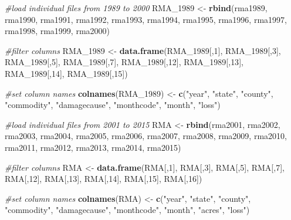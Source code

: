 \documentclass[]{article}
\newenvironment{Shaded}{\begin{snugshade}}{\end{snugshade}}
\newcommand{\CommentTok}[1]{\textcolor[rgb]{0.56,0.35,0.01}{\textit{#1}}}
\newcommand{\DecValTok}[1]{\textcolor[rgb]{0.00,0.00,0.81}{#1}}
\newcommand{\KeywordTok}[1]{\textcolor[rgb]{0.13,0.29,0.53}{\textbf{#1}}}
\newcommand{\NormalTok}[1]{#1}
\newcommand{\StringTok}[1]{\textcolor[rgb]{0.31,0.60,0.02}{#1}}
\begin{document}
\begin{Shaded}
\begin{Highlighting}[]
\CommentTok{#load individual files from 1989 to 2000}
\NormalTok{RMA_}\DecValTok{1989}\NormalTok{ <-}\StringTok{ }\KeywordTok{rbind}\NormalTok{(rma1989, rma1990, rma1991, rma1992, rma1993, rma1994, rma1995, rma1996, rma1997, rma1998, rma1999, rma2000)}

\CommentTok{#filter columns}
\NormalTok{RMA_}\DecValTok{1989}\NormalTok{ <-}\StringTok{ }\KeywordTok{data.frame}\NormalTok{(RMA_}\DecValTok{1989}\NormalTok{[,}\DecValTok{1}\NormalTok{], RMA_}\DecValTok{1989}\NormalTok{[,}\DecValTok{3}\NormalTok{], RMA_}\DecValTok{1989}\NormalTok{[,}\DecValTok{5}\NormalTok{], RMA_}\DecValTok{1989}\NormalTok{[,}\DecValTok{7}\NormalTok{], RMA_}\DecValTok{1989}\NormalTok{[,}\DecValTok{12}\NormalTok{], RMA_}\DecValTok{1989}\NormalTok{[,}\DecValTok{13}\NormalTok{], RMA_}\DecValTok{1989}\NormalTok{[,}\DecValTok{14}\NormalTok{], RMA_}\DecValTok{1989}\NormalTok{[,}\DecValTok{15}\NormalTok{])}

\CommentTok{#set column names}
\KeywordTok{colnames}\NormalTok{(RMA_}\DecValTok{1989}\NormalTok{) <-}\StringTok{ }\KeywordTok{c}\NormalTok{(}\StringTok{"year"}\NormalTok{, }\StringTok{"state"}\NormalTok{, }\StringTok{"county"}\NormalTok{, }\StringTok{"commodity"}\NormalTok{, }\StringTok{"damagecause"}\NormalTok{, }\StringTok{"monthcode"}\NormalTok{, }\StringTok{"month"}\NormalTok{, }\StringTok{"loss"}\NormalTok{)}

\CommentTok{#load individual files from 2001 to 2015}
\NormalTok{RMA <-}\StringTok{ }\KeywordTok{rbind}\NormalTok{(rma2001, rma2002, rma2003, rma2004, rma2005, rma2006, rma2007, rma2008, rma2009, rma2010, rma2011, rma2012, rma2013, rma2014, rma2015)}

\CommentTok{#filter columns}
\NormalTok{RMA <-}\StringTok{ }\KeywordTok{data.frame}\NormalTok{(RMA[,}\DecValTok{1}\NormalTok{], RMA[,}\DecValTok{3}\NormalTok{], RMA[,}\DecValTok{5}\NormalTok{], RMA[,}\DecValTok{7}\NormalTok{], RMA[,}\DecValTok{12}\NormalTok{], RMA[,}\DecValTok{13}\NormalTok{], RMA[,}\DecValTok{14}\NormalTok{], RMA[,}\DecValTok{15}\NormalTok{], RMA[,}\DecValTok{16}\NormalTok{])}

\CommentTok{#set column names}
\KeywordTok{colnames}\NormalTok{(RMA) <-}\StringTok{ }\KeywordTok{c}\NormalTok{(}\StringTok{"year"}\NormalTok{, }\StringTok{"state"}\NormalTok{, }\StringTok{"county"}\NormalTok{, }\StringTok{"commodity"}\NormalTok{, }\StringTok{"damagecause"}\NormalTok{, }\StringTok{"monthcode"}\NormalTok{, }\StringTok{"month"}\NormalTok{, }\StringTok{"acres"}\NormalTok{, }\StringTok{"loss"}\NormalTok{)}


\end{Highlighting}
\end{Shaded}
\end{document}
